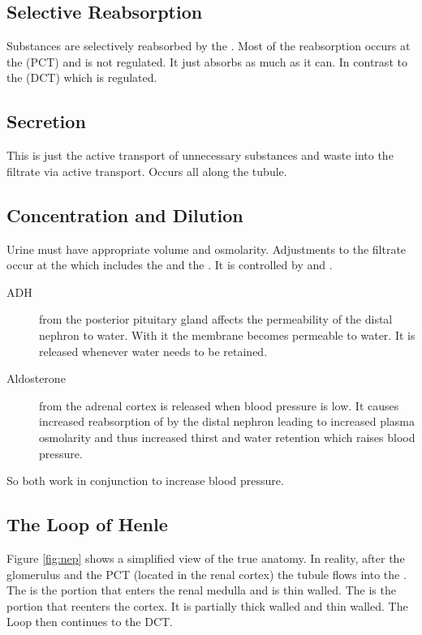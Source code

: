 \documentclass[../Bio_chemistryReview.tex]{subfiles}
\begin{document}
\subsection{Selective Reabsorption}
Substances are selectively reabsorbed by the .
Most of the reabsorption occurs at the 
(PCT) and is not regulated. It just absorbs as much as it can. In contrast to
the  (DCT) which is regulated. 

\subsection{Secretion}
This is just the active transport of unnecessary substances and waste into the
filtrate via active transport. Occurs all along the tubule.

\subsection{Concentration and Dilution}
Urine must have appropriate volume and osmolarity. Adjustments to the filtrate
occur at the  which includes the  and the
. It is controlled by  and
.
\begin{description}
  \item[ADH] from the posterior pituitary gland affects the permeability of the
    distal nephron to water. With it the membrane becomes permeable to water. It
    is released whenever water needs to be retained.
  \item[Aldosterone] from the adrenal cortex is released when blood pressure is
    low. It causes increased reabsorption of  by the distal
    nephron leading to increased plasma osmolarity and thus increased thirst and
    water retention which raises blood pressure.
\end{description}
So both work in conjunction to increase blood pressure.

\subsection{The Loop of Henle}
Figure \ref{fig:nep} shows a simplified view of the true anatomy. In reality,
after the glomerulus and the PCT (located in the renal cortex) the tubule flows
into the . The 
is the portion that enters the renal medulla and is thin walled. The
 is the portion that reenters the cortex.
It is partially thick walled and thin walled. The Loop then continues to the
DCT.\par
\end{document}
